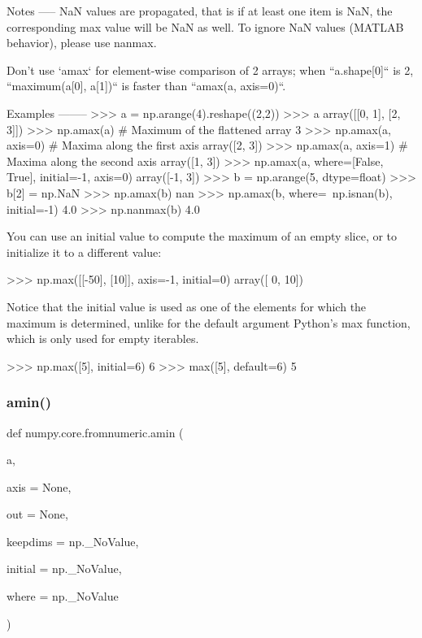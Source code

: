 \begin{DoxyVerb}
Notes
-----
NaN values are propagated, that is if at least one item is NaN, the
corresponding max value will be NaN as well. To ignore NaN values
(MATLAB behavior), please use nanmax.

Don't use `amax` for element-wise comparison of 2 arrays; when
``a.shape[0]`` is 2, ``maximum(a[0], a[1])`` is faster than
``amax(a, axis=0)``.

Examples
--------
>>> a = np.arange(4).reshape((2,2))
>>> a
array([[0, 1],
       [2, 3]])
>>> np.amax(a)           # Maximum of the flattened array
3
>>> np.amax(a, axis=0)   # Maxima along the first axis
array([2, 3])
>>> np.amax(a, axis=1)   # Maxima along the second axis
array([1, 3])
>>> np.amax(a, where=[False, True], initial=-1, axis=0)
array([-1,  3])
>>> b = np.arange(5, dtype=float)
>>> b[2] = np.NaN
>>> np.amax(b)
nan
>>> np.amax(b, where=~np.isnan(b), initial=-1)
4.0
>>> np.nanmax(b)
4.0

You can use an initial value to compute the maximum of an empty slice, or
to initialize it to a different value:

>>> np.max([[-50], [10]], axis=-1, initial=0)
array([ 0, 10])

Notice that the initial value is used as one of the elements for which the
maximum is determined, unlike for the default argument Python's max
function, which is only used for empty iterables.

>>> np.max([5], initial=6)
6
>>> max([5], default=6)
5
\end{DoxyVerb}
 \mbox{\label{namespacenumpy_1_1core_1_1fromnumeric_accc14da5c1e60491a6d9c5feb2893aca}} 
\subsubsection{\texorpdfstring{amin()}{amin()}}
{\footnotesize\ttfamily def numpy.\+core.\+fromnumeric.\+amin (\begin{DoxyParamCaption}\item[{}]{a,  }\item[{}]{axis = {\ttfamily None},  }\item[{}]{out = {\ttfamily None},  }\item[{}]{keepdims = {\ttfamily np.\+\_\+NoValue},  }\item[{}]{initial = {\ttfamily np.\+\_\+NoValue},  }\item[{}]{where = {\ttfamily np.\+\_\+NoValue} }\end{DoxyParamCaption})}

